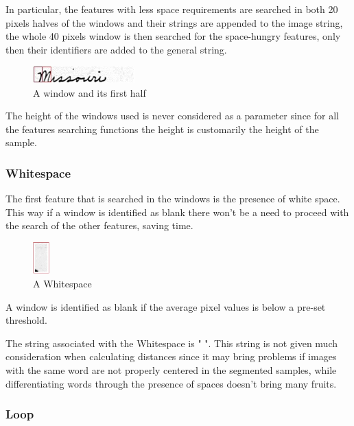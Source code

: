 In particular, the features with less space requirements are searched in both 20 pixels halves of the windows and their strings are appended to the image string, the whole 40 pixels window is then searched for the space-hungry features, only then their identifiers are added to the general string. 

\begin{figure}[!htpb]
\centering
\includegraphics[width=0.35\textwidth]{images/missouri_windows.jpg}
\caption{A window and its first half}
\end{figure} 

The height of the windows used is never considered as a parameter since for all the features searching functions the height is customarily the height of the sample.  

\subsubsection{Whitespace}  

The first feature that is searched in the windows is the presence of white space. This way if a window is identified as blank there won't be a need to proceed with the search of the other features, saving time.

\begin{figure}[!htpb]
\centering
\includegraphics[width=0.06\textwidth]{images/whitespace.jpg}
\caption{A Whitespace}
\end{figure} 

A window is identified as blank if the average pixel values is below a pre-set threshold.

The string associated with the Whitespace is " ".
This string is not given much consideration when calculating distances since it may bring problems if images with the same word are not properly centered in the segmented samples, while differentiating words through the presence of spaces doesn't bring many fruits.

\subsubsection{Loop}

